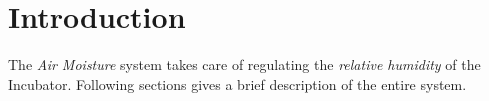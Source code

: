 \documentclass[../../main]{subfiles}
\begin{document}
\section{Introduction} \label{sec:}

The \emph{Air Moisture} system takes care of regulating the \emph{relative humidity} of the Incubator.
Following sections gives a brief description of the entire system.
\end{document}
